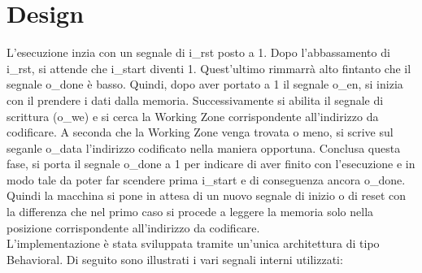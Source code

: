\documentclass{article}
\begin{document}
\section{Design}
L'esecuzione inzia con un segnale di {\selectfont i\_rst} posto a 1. Dopo l'abbassamento di {\selectfont i\_rst}, si attende che {\selectfont i\_start} diventi 1. Quest'ultimo rimmarrà alto fintanto che il segnale {\selectfont o\_done} è basso. Quindi, dopo aver portato a 1 il segnale {\selectfont o\_en}, si inizia con il prendere i dati dalla memoria. Successivamente si abilita il segnale di scrittura ({\selectfont o\_we}) e si cerca la Working Zone corrispondente all'indirizzo da codificare. A seconda che la Working Zone venga trovata o meno, si scrive sul seganle {\selectfont o\_data} l'indirizzo codificato nella maniera opportuna. Conclusa questa fase, si porta il segnale {\selectfont o\_done} a 1 per indicare di aver finito con l'esecuzione e in modo tale da poter far scendere prima {\selectfont i\_start} e di conseguenza ancora {\selectfont o\_done}. Quindi la macchina si pone in attesa di un nuovo segnale di inizio o di reset con la differenza che nel primo caso si procede a leggere la memoria solo nella posizione corrispondente all'indirizzo da codificare.\\
L'implementazione è stata sviluppata tramite un'unica architettura di tipo Behavioral. Di seguito sono illustrati i vari segnali interni utilizzati:\\\\
\end{document}
